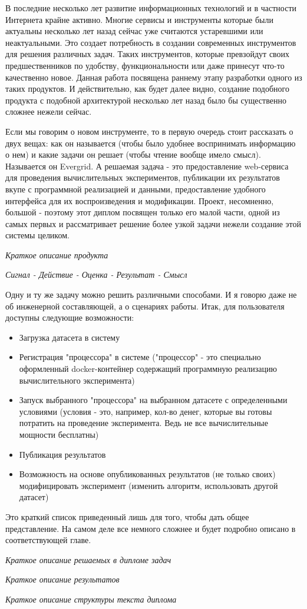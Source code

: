 \intro

В последние несколько лет развитие информационных технологий и в частности Интернета крайне активно. Многие сервисы и инструменты которые были актуальны несколько лет назад сейчас уже считаются устаревшими или неактуальными. Это создает потребность в создании современных инструментов для решения различных задач. Таких инструментов, которые превзойдут своих предшественников по удобству, функциональности или даже принесут что-то качественно новое. Данная работа посвящена раннему этапу разработки одного из таких продуктов. И действительно, как будет далее видно, создание подобного продукта с подобной архитектурой несколько лет назад было бы существенно сложнее нежели сейчас.

Если мы говорим о новом инструменте, то в первую очередь стоит рассказать о двух вещах: как он называется (чтобы было удобнее воспринимать информацию о нем) и какие задачи он решает (чтобы чтение вообще имело смысл). Называется он Evergrid. А решаемая задача - это предоставление web-сервиса для проведения вычислительных экспериментов, публикации их результатов вкупе с программной реализацией и данными, предоставление удобного интерфейса для их воспроизведения и модификации. Проект, несомненно, большой - поэтому этот диплом посвящен только его малой части, одной из самых первых и рассматривает решение более узкой задачи нежели создание этой системы целиком.

\textit{Краткое описание продукта}

\textit{Сигнал - Действие - Оценка - Результат - Смысл}

Одну и ту же задачу можно решить различными способами. И я говорю даже не об инженерной составляющей, а о сценариях работы. Итак, для пользователя доступны следующие возможности:

\begin{itemize}
	\item Загрузка датасета в систему
	\item Регистрация "процессора" в системе ("процессор" - это специально оформленный docker-контейнер содержащий программную реализацию вычислительного эксперимента)
	\item Запуск выбранного "процессора" на выбранном датасете с определенными условиями (условия - это, например, кол-во денег, которые вы готовы потратить на проведение эксперимента. Ведь не все вычислительные мощности бесплатны)
	\item Публикация результатов
	\item Возможность на основе опубликованных результатов (не только своих) модифицировать эксперимент (изменить алгоритм, использовать другой датасет)
\end{itemize}

Это краткий список приведенный лишь для того, чтобы дать общее представление. На самом деле все немного сложнее и будет подробно описано в соответствующей главе.

\textit{Краткое описание решаемых в дипломе задач}

\textit{Краткое описание результатов}

\textit{Краткое описание структуры текста диплома}